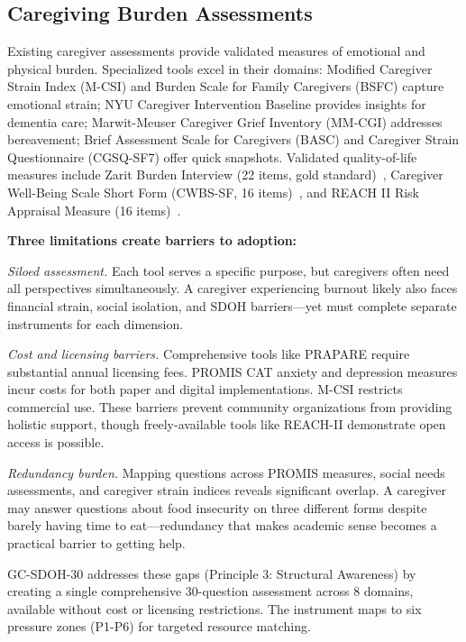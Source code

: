 \documentclass{article}
\begin{document}
%
\subsection{Caregiving Burden Assessments}%
\label{subsec:CaregivingBurdenAssessments}%
Existing caregiver assessments provide validated measures of emotional and physical burden. Specialized tools excel in their domains: Modified Caregiver Strain Index (M-CSI) and Burden Scale for Family Caregivers (BSFC) capture emotional strain; NYU Caregiver Intervention Baseline provides insights for dementia care; Marwit-Meuser Caregiver Grief Inventory (MM-CGI) addresses bereavement; Brief Assessment Scale for Caregivers (BASC) and Caregiver Strain Questionnaire (CGSQ-SF7) offer quick snapshots. Validated quality-of-life measures include Zarit Burden Interview (22 items, gold standard)~\cite{zarit1980}, Caregiver Well-Being Scale Short Form (CWBS-SF, 16 items)~\cite{tebb1995,tebb2013}, and REACH II Risk Appraisal Measure (16 items)~\cite{bella2006}.

\textbf{Three limitations create barriers to adoption:}

\textit{Siloed assessment.} Each tool serves a specific purpose, but caregivers often need all perspectives simultaneously. A caregiver experiencing burnout likely also faces financial strain, social isolation, and SDOH barriers—yet must complete separate instruments for each dimension.

\textit{Cost and licensing barriers.} Comprehensive tools like PRAPARE require substantial annual licensing fees. PROMIS CAT anxiety and depression measures incur costs for both paper and digital implementations. M-CSI restricts commercial use. These barriers prevent community organizations from providing holistic support, though freely-available tools like REACH-II demonstrate open access is possible.

\textit{Redundancy burden.} Mapping questions across PROMIS measures, social needs assessments, and caregiver strain indices reveals significant overlap. A caregiver may answer questions about food insecurity on three different forms despite barely having time to eat—redundancy that makes academic sense becomes a practical barrier to getting help.

GC-SDOH-30 addresses these gaps (Principle 3: Structural Awareness) by creating a single comprehensive 30-question assessment across 8 domains, available without cost or licensing restrictions. The instrument maps to six pressure zones (P1-P6) for targeted resource matching.
\end{document}

